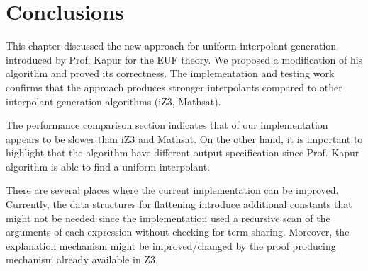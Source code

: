 \section{Conclusions}

This chapter discussed the new approach
for uniform interpolant generation introduced by
Prof. Kapur for the EUF theory. We 
proposed a modification of his algorithm
and proved its correctness. The 
implementation and testing work confirms 
that the approach produces stronger interpolants
compared to other interpolant generation
algorithms (iZ3, Mathsat).

The performance comparison section indicates
that of our implementation appears to be slower 
than iZ3 and Mathsat. 
On the other hand, it is important to 
highlight that the algorithm have different
output specification since Prof. Kapur algorithm
is able to find a uniform interpolant.

There are several places
where the current implementation can be
improved. Currently, the data structures
for flattening introduce additional constants
that might not be needed since the implementation
used a recursive scan of the arguments of each
expression without checking for term sharing.
Moreover, the explanation mechanism might be
improved/changed by the proof producing mechanism
already available in Z3. 

